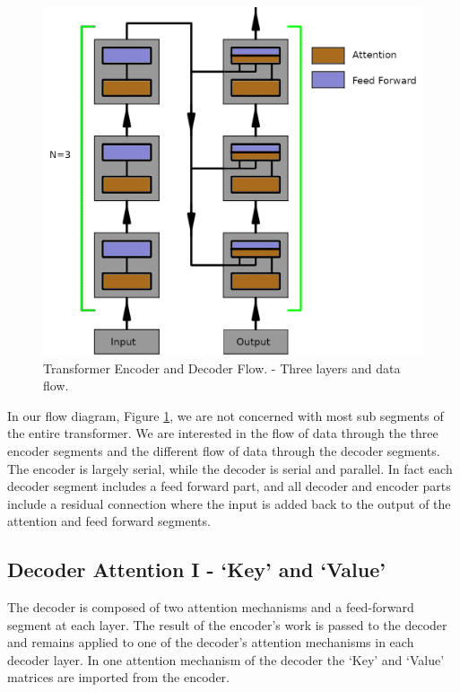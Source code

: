 \begin{figure}[H]
	\begin{center}
		
		
		\includegraphics[scale=1.0]{diagram-flow1}
	\end{center}
	\caption[Transformer Encoder and Decoder Flow]{Transformer Encoder and Decoder Flow. - Three layers and data flow.}
	\label{diagram-flow1}
	
\end{figure}

In our flow diagram, Figure \ref{diagram-flow1}, we are not concerned with most sub segments of the entire transformer. We are interested in the flow of data through the three encoder segments and the different flow of data through the decoder segments. The encoder is largely serial, while the decoder is serial and parallel. In fact each decoder segment includes a feed forward part, and all decoder and encoder parts include a residual connection where the input is added back to the output of the attention and feed forward segments.

\subsection{Decoder Attention I - `Key' and `Value'}
The decoder is composed of two attention mechanisms and a feed-forward segment at each layer. The result of the encoder's work is passed to the decoder and remains applied to one of the decoder's attention mechanisms in each decoder layer. In one attention mechanism of the decoder the `Key' and `Value' matrices are imported from the encoder. 

